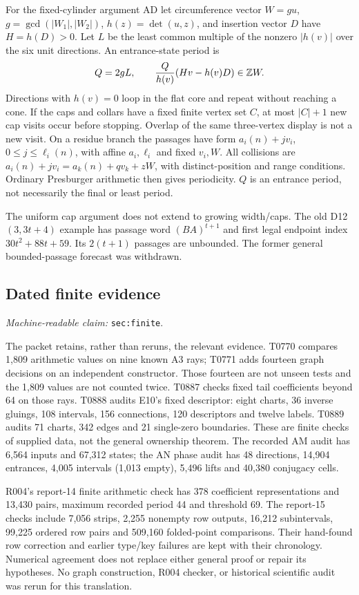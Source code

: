 \documentclass[11pt]{amsart}
\newcommand{\Z}{\mathbb Z}
\newcommand{\record}[1]{\nolinkurl{#1}}
\newcommand{\claimid}[1]{\par\nopagebreak\noindent\textit{Machine-readable claim:} \record{#1}.\par}
\theoremstyle{definition}\newtheorem{definition}{Definition}
\begin{document}
For the fixed-cylinder argument AD let circumference vector $W=gu$,
$g=\gcd(|W_1|,|W_2|)$, $h(z)=\det(u,z)$, and insertion vector $D$
have $H=h(D)>0$. Let $L$ be the least common multiple of the nonzero
$|h(v)|$ over the six unit directions. An entrance-state period is
\begin{equation}\label{eq:cylinder}
 Q=2gL,\qquad {Q\over h(v)}(Hv-h(v)D)\in\Z W.
\end{equation}
Directions with $h(v)=0$ loop in the flat core and repeat without
reaching a cone. If the caps and collars have a fixed finite vertex
set $C$, at most $|C|+1$ new cap visits occur before stopping. Overlap
of the same three-vertex display is not a new visit. On a residue
branch the passages have form $a_i(n)+jv_i$, $0\le j\le\ell_i(n)$,
with affine $a_i,\ell_i$ and fixed $v_i,W$. All collisions are
$a_i(n)+jv_i=a_k(n)+qv_k+zW$, with distinct-position and range
conditions. Ordinary Presburger arithmetic then gives periodicity.
$Q$ is an entrance period, not necessarily the final or least period.

The uniform cap argument does not extend to growing width/caps.
The old D12$(3,3t+4)$ example has passage word $(BA)^{t+1}$ and first
legal endpoint index $30t^2+88t+59$. Its $2(t+1)$ passages are unbounded.
The former general bounded-passage forecast was withdrawn.

\subsection{Dated finite evidence}\label{sec:finite}
\claimid{sec:finite}
The packet retains, rather than reruns, the relevant evidence.
T0770 compares 1,809 arithmetic values on nine known A3 rays;
T0771 adds fourteen graph decisions on an independent constructor.
Those fourteen are not unseen tests and the 1,809 values are not counted
twice. T0887 checks fixed tail coefficients beyond 64 on those rays.
T0888 audits E10's fixed descriptor: eight charts, 36 inverse gluings,
108 intervals, 156 connections, 120 descriptors and twelve labels.
T0889 audits 71 charts, 342 edges and 21 single-zero boundaries.
These are finite checks of supplied data, not the general ownership
theorem. The recorded AM audit has 6,564 inputs and 67,312 states;
the AN phase audit has 48 directions, 14,904 entrances, 4,005 intervals
(1,013 empty), 5,496 lifts and 40,380 conjugacy cells.

R004's report-14 finite arithmetic check has 378 coefficient
representations and 13,430 pairs, maximum recorded period 44 and
threshold 69. The report-15 checks include 7,056 strips, 2,255 nonempty
row outputs, 16,212 subintervals, 99,225 ordered row pairs and 509,160
folded-point comparisons. Their hand-found row correction and earlier
type/key failures are kept with their chronology. Numerical agreement
does not replace either general proof or repair its hypotheses.
No graph construction, R004 checker, or historical scientific audit
was rerun for this translation.
\end{document}
